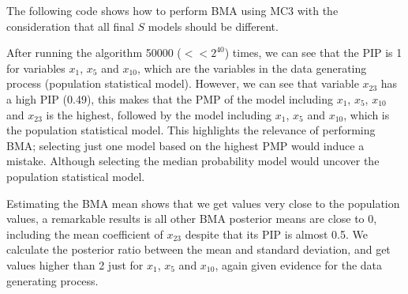 \begin{enumerate}[leftmargin=*]
The following code shows how to perform BMA using MC3 with the consideration that all final $S$ models should be different.

After running the algorithm 50000 ($<<2^{40}$) times, we can see that the PIP is 1 for variables $x_1$, $x_5$ and $x_{10}$, which are the variables in the data generating process (population statistical model). However, we can see that variable $x_{23}$ has a high PIP (0.49), this makes that the PMP of the model including $x_1$, $x_5$, $x_{10}$ and $x_{23}$ is the highest, followed by the model including $x_1$, $x_5$ and $x_{10}$, which is the population statistical model. This highlights the relevance of performing BMA; selecting just one model based on the highest PMP would induce a mistake. Although selecting the median probability model would uncover the population statistical model. 

Estimating the BMA mean shows that we get values very close to the population values, a remarkable results is all other BMA posterior means are close to 0, including the mean coefficient of $x_{23}$ despite that its PIP is almost 0.5. We calculate the posterior ratio between the mean and standard deviation, and get values higher than 2 just for $x_1$, $x_5$ and $x_{10}$, again given evidence for the data generating process.     
	

\end{enumerate}

